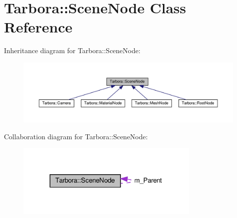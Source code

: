 \hypertarget{classTarbora_1_1SceneNode}{}\section{Tarbora\+:\+:Scene\+Node Class Reference}
\label{classTarbora_1_1SceneNode}


Inheritance diagram for Tarbora\+:\+:Scene\+Node\+:\nopagebreak
\begin{figure}[H]
\begin{center}
\leavevmode
\includegraphics[width=350pt]{classTarbora_1_1SceneNode__inherit__graph}
\end{center}
\end{figure}


Collaboration diagram for Tarbora\+:\+:Scene\+Node\+:\nopagebreak
\begin{figure}[H]
\begin{center}
\leavevmode
\includegraphics[width=251pt]{classTarbora_1_1SceneNode__coll__graph}
\end{center}
\end{figure}
